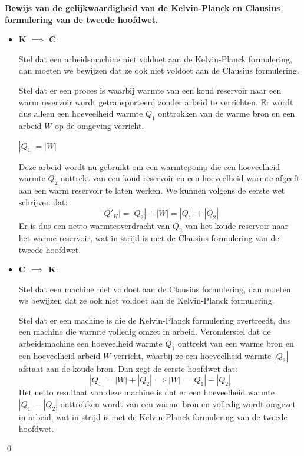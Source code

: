 \begin{derivation}
    \textbf{Bewijs van de gelijkwaardigheid van de Kelvin-Planck en Clausius formulering van de tweede hoofdwet.}
\begin{itemize}
    \item \textbf{K \(\implies\) C}:

    Stel dat een arbeidsmachine niet voldoet aan de Kelvin-Planck formulering, dan moeten we bewijzen dat ze ook niet voldoet aan de Clausius formulering.

    Stel dat er een proces is waarbij warmte van een koud reservoir naar een warm reservoir wordt getransporteerd zonder arbeid te verrichten.
    Er wordt dus alleen een hoeveelheid warmte \(Q_1\) onttrokken van de warme bron en een arbeid \(W\) op de omgeving verricht.

        \(|Q_1| =  |W|\)

    Deze arbeid wordt nu gebruikt om een warmtepomp die een hoeveelheid warmte \(Q_2\) onttrekt van een koud reservoir en een hoeveelheid warmte afgeeft aan een warm reservoir te laten werken.
    We kunnen volgens de eerste wet schrijven dat:
    \[|Q'_H | = |Q_2| + |W| = |Q_1| + |Q_2|\]
    Er is dus een netto warmteoverdracht van \(Q_2\) van het koude reservoir naar het warme reservoir, wat in strijd is met de Clausius formulering van de tweede hoofdwet.

    \item \textbf{C \(\implies\) K}:

    Stel dat een machine niet voldoet aan de Clausius formulering, dan moeten we bewijzen dat ze ook niet voldoet aan de Kelvin-Planck formulering.

    Stel dat er een machine is die de Kelvin-Planck formulering overtreedt, dus een machine die warmte volledig omzet in arbeid.
    Veronderstel dat de arbeidsmachine een hoeveelheid warmte \(Q_1\) onttrekt van een warme bron en een hoeveelheid arbeid \(W\) verricht, waarbij ze een hoeveelheid warmte \(|Q_2|\) afstaat aan de koude bron.
    Dan zegt de eerste hoofdwet dat:
    \[|Q_1| = |W| + |Q_2| \implies |W| = |Q_1| - |Q_2|\]
    Het netto resultaat van deze machine is dat er een hoeveelheid warmte \(|Q_1|-|Q_2|\) onttrokken wordt van een warme bron en volledig wordt omgezet in arbeid, wat in strijd is met de Kelvin-Planck formulering van de tweede hoofdwet.
\end{itemize}
\qed
\end{derivation}
